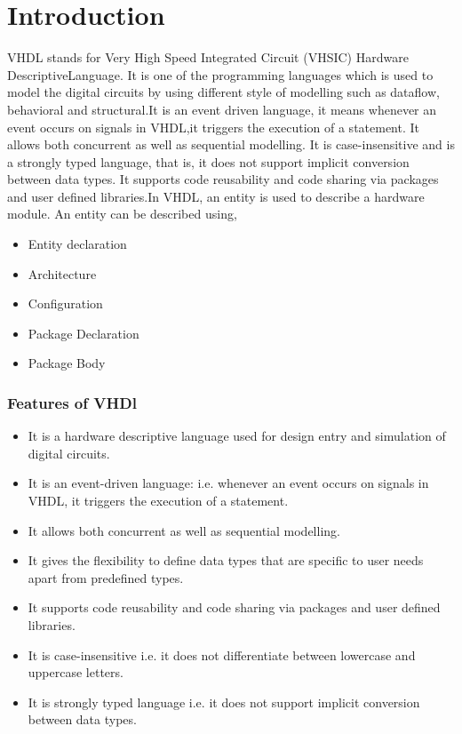 \documentclass{article}
\begin{document}
\section{Introduction}
VHDL stands  for  Very  High  Speed  Integrated  Circuit  (VHSIC)  Hardware  DescriptiveLanguage. It is one of the programming languages which is used to model the digital circuits by  using  different  style  of modelling such  as  dataflow,  behavioral  and  structural.It  is  an event driven language, it means whenever an event occurs on signals in VHDL,it triggers the execution of a statement. It allows both concurrent as well as sequential modelling. It is case-insensitive  and  is  a  strongly  typed  language,  that  is,  it  does not support  implicit  conversion between  data  types.  It  supports  code  reusability  and  code sharing  via  packages  and  user defined libraries.In VHDL, an entity is used to describe a hardware module. An entity can be described using,

\begin{itemize}
    \item Entity declaration
    \item Architecture
    \item Configuration
    \item Package Declaration
    \item Package Body
\end{itemize}


\subsubsection{Features of VHDl}
\begin{itemize}
    \item It is a hardware descriptive language used for design
          entry and simulation of digital circuits.
    \item It is an event-driven language: i.e. whenever an event
          occurs on signals in VHDL, it triggers the execution of
          a statement.
    \item It allows both concurrent as well as sequential
          modelling.
    \item It gives the flexibility to define data types that are
          specific to user needs apart from predefined types.
    \item It supports code reusability and code sharing via
          packages and user defined libraries.
    \item It is case-insensitive i.e. it does not differentiate
          between lowercase and uppercase letters.
    \item It is strongly typed language i.e. it does not support
          implicit conversion between data types.
\end{itemize}
\end{document}
